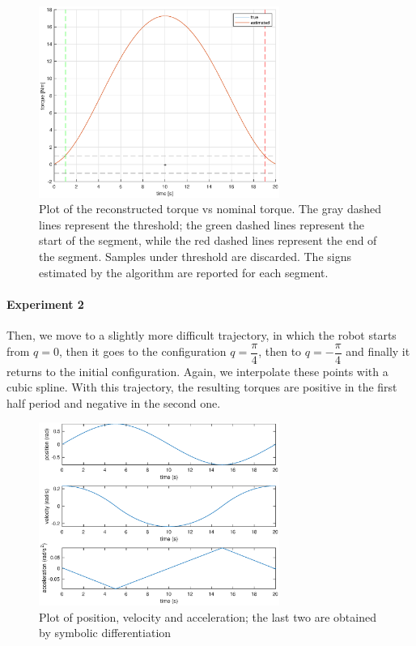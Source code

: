 \documentclass{article}
\begin{document}
\begin{figure}[!htbp]
\centering
\includegraphics[width=0.7\textwidth]{images/1-dof/results1.eps}
\caption{Plot of the reconstructed torque vs nominal torque. The gray dashed lines represent the threshold; the green dashed lines represent the start of the segment, while the red dashed lines represent the end of the segment. Samples under threshold are discarded. The signs estimated by the algorithm are reported for each segment.}
\end{figure}
\FloatBarrier

\paragraph{Experiment 2}Then, we move to a slightly more difficult trajectory, in which the robot starts from $q = 0$, then it goes to the configuration $q = \dfrac{\pi}{4}$, then to $q = -\dfrac{\pi}{4}$ and finally it returns to the initial configuration. Again, we interpolate these points with a cubic spline. With this trajectory, the resulting torques are positive in the first half period and negative in the second one.

\begin{figure}[!htbp]
\centering
\includegraphics[width=0.7\textwidth]{images/1-dof/trajectory_easy2.eps}
\caption{Plot of position, velocity and acceleration; the last two are obtained by symbolic differentiation}
\end{figure}
\FloatBarrier
\end{document}
